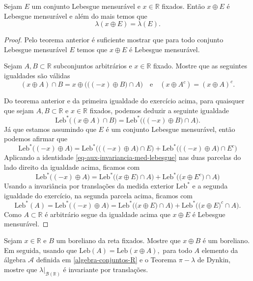 \begin{teorema}
Sejam $E$ um conjunto Lebesgue mensurável e $x\in\mathbb{R}$
fixados. Então $x\oplus E$ é Lebesgue mensurável e além do 
mais temos que 
\[
\lambda(x\oplus E)= \lambda(E).
\]
\end{teorema}

\begin{proof}
Pelo teorema anterior é suficiente mostrar que 
para todo conjunto Lebesgue mensurável $E$ temos 
que $x\oplus E$ é Lebesgue mensurável.
\begin{exercicio}
Sejam $A,B\subset \mathbb{R}$ subconjuntos arbitrários
e $x\in\mathbb{R}$ fixado. Mostre que as seguintes igualdades
são válidas
\[
(x\oplus A)\cap B 
= 
x\oplus 
\Big( \big((-x)\oplus B\big) \cap A  \Big)
\quad\text{e}\quad
(x\oplus A^c) = (x\oplus A)^c.
\]
\end{exercicio}
Do teorema anterior e da primeira igualdade do exercício 
acima, para quaisquer que sejam $A,B\subset \mathbb{R}$ 
e $x\in\mathbb{R}$ fixados, podemos deduzir a seguinte igualdade  
\begin{equation}\label{eq-aux-invariancia-med-lebesgue}
\mathrm{Leb}^*\big((x\oplus A)\cap B\big)
= 
\mathrm{Leb}^*
\Big(\big((-x)\oplus B\big) \cap A \Big).
\end{equation}
Já que estamos assumindo que $E$ 
é um conjunto Lebesgue mensurável, então 
podemos afirmar que 
\[
\mathrm{Leb}^*\big((-x)\oplus A\big)
=
\mathrm{Leb}^*\Big( \big((-x)\oplus A\big) \cap E\Big)
+
\mathrm{Leb}^*\Big( \big((-x)\oplus A\big) \cap E^c\Big)
\]
Aplicando a identidade 
\eqref{eq-aux-invariancia-med-lebesgue} nas duas parcelas
do lado direito da igualdade acima, ficamos com 
\[
\mathrm{Leb}^*\big((-x)\oplus A\big)
=
\mathrm{Leb}^*\Big( \big(x\oplus E\big) \cap A\Big)
+
\mathrm{Leb}^*\Big( \big(x\oplus E^c\big) \cap A\Big)
\]
Usando a invariância por translações da medida exterior 
$\mathrm{Leb}^*$ e a segunda igualdade do exercício,
na segunda parcela acima, ficamos com 
\[
\mathrm{Leb}^*(A)
=
\mathrm{Leb}^*\big((-x)\oplus A\big)
=
\mathrm{Leb}^*\Big( \big(x\oplus E\big) \cap A\Big)
+
\mathrm{Leb}^*\Big( \big(x\oplus E\big)^c \cap A\Big).
\]
Como $A\subset \mathbb{R}$ é arbitrário segue da igualdade acima que 
$x\oplus E$ é Lebesgue mensurável.
\end{proof}







\begin{exercicio}
Sejam $x\in\mathbb{R}$ e $B$ um boreliano da reta fixados.
Mostre que $x\oplus B$ é um boreliano.
Em seguida, usando que 
$
	\mathrm{Leb}(A)=\mathrm{Leb}(x\oplus A),
$
para todo $A$ elemento da 
álgebra $\mathcal{A}$ definida em \eqref{algebra-conjuntos-R}
e o Teorema $\pi-\lambda$ de Dynkin,
mostre que $\lambda\big|_{\mathscr{B}(\mathbb{R})}$
é invariante por translações. 

\end{exercicio}